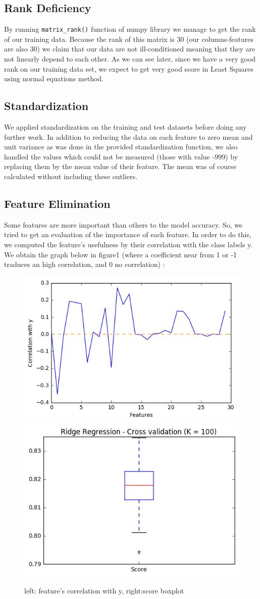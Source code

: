 \documentclass[10pt,conference,compsocconf]{IEEEtran}
\begin{document}
\subsection{Rank Deficiency}
By running \verb|matrix_rank()| function of numpy library we manage to get the rank of our training data. Because the rank of this matrix is 30 (our columns-features are also 30) we claim that our data are not ill-conditioned meaning that they are not linearly depend to each other. As we can see later, since we have a very good rank on our training data set, we expect to get very good score in Least Squares using normal equations method.
\subsection{Standardization}
We applied standardization on the training and test datasets before doing any further work. In addition to reducing the data on each feature to zero mean and unit variance as was done in the provided standardization function, we also handled the values which could not be measured (those with value -999) by replacing them by the mean value of their feature. The mean was of course calculated without including these outliers.
\subsection{Feature Elimination}
Some features are more important than others to the model accuracy. So, we tried to get an evaluation of the importance of each feature. In order to do this, we computed the feature's usefulness by their correlation with the class labels y. We obtain the graph below in figure1 (where a coefficient near from 1 or -1 traduces an high correlation, and 0 no correlation) :

\begin{figure}[h]
  \centering
  \includegraphics[width=0.42\columnwidth]{features}
  \includegraphics[width=0.42\columnwidth]{boxplot}
  \caption{left: feature's correlation with y, right:score boxplot}
  \vspace{-3mm}
\end{figure}
\end{document}
